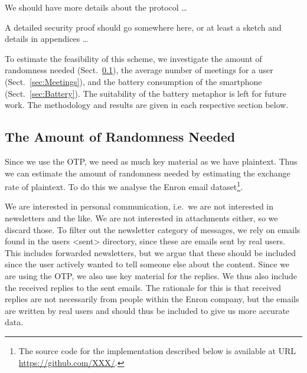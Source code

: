 We should have more details about the protocol \dots

A detailed security proof should go somewhere here, or at least a sketch and 
details in appendices \dots

To estimate the feasibility of this scheme, we investigate the amount of 
randomness needed (Sect.~\ref{sec:NeededRandomness}), the average number of 
meetings for a user (Sect.~\ref{sec:Meetings}), and the battery consumption of 
the smartphone (Sect.~\ref{sec:Battery}).
The suitability of the battery metaphor is left for future work.
The methodology and results are given in each respective section below.

\subsection{The Amount of Randomness Needed}
\label{sec:NeededRandomness}
Since we use the \ac{OTP}, we need as much key material as we have plaintext.
Thus we can estimate the amount of randomness needed by estimating the exchange 
rate of plaintext.
To do this we analyse the Enron email dataset\footnote{%
  The source code for the implementation described below is available at URL 
  \url{https://github.com/XXX/}.
}.

We are interested in personal communication, i.e.~we are not interested in 
newsletters and the like.
We are not interested in attachments either, so we discard those.
To filter out the newsletter category of messages, we rely on emails found in 
the users <sent> directory, since these are emails sent by real users.
This includes forwarded newsletters, but we argue that these should be included 
since the user actively wanted to tell someone else about the content.
Since we are using the \ac{OTP}, we also use key material for the replies.
We thus also include the received replies to the sent emails.
The rationale for this is that received replies are not necessarily from people 
within the Enron company, but the emails are written by real users and should 
thus be included to give us more accurate data.


